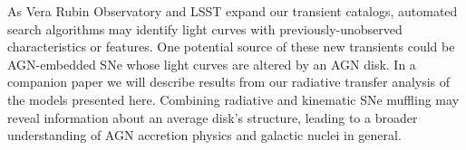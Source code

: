 As Vera Rubin Observatory and LSST expand our transient catalogs, automated search algorithms may identify light curves with previously-unobserved characteristics or features.
One potential source of these new transients could be AGN-embedded SNe whose light curves are altered by an AGN disk.
In a companion paper we will describe results from our radiative transfer analysis of the models presented here.
Combining radiative and kinematic SNe muffling may reveal information about an average disk's structure, leading to a broader understanding of AGN accretion physics and galactic nuclei in general.






% 
